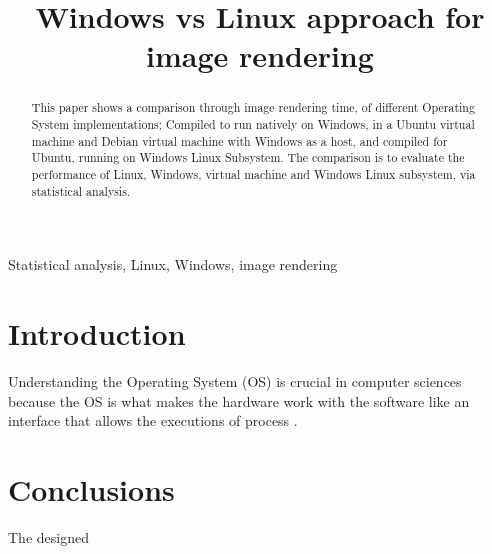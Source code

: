 \documentclass[conference]{IEEEtran}
\begin{document}
\title{Windows vs Linux approach for image rendering}

\author{

}

\maketitle

\begin{abstract}
This paper shows a comparison through image rendering time, of different Operating System implementations; Compiled to run natively on Windows, in a Ubuntu virtual machine and Debian virtual machine with Windows as a host, and compiled for Ubuntu, running on Windows Linux Subsystem. The comparison is to evaluate the performance of Linux, Windows, virtual machine and Windows Linux subsystem, via statistical analysis. 

\end{abstract}

\begin{IEEEkeywords}
Statistical analysis, Linux, Windows, image rendering
\end{IEEEkeywords}

\section{Introduction}
Understanding the Operating System (OS) is crucial in computer sciences because the OS is what makes the
hardware work with the software like an
interface that allows the executions of process \cite{dhamija2012demographics}.
\section{Conclusions}
The designed 




\end{document}
